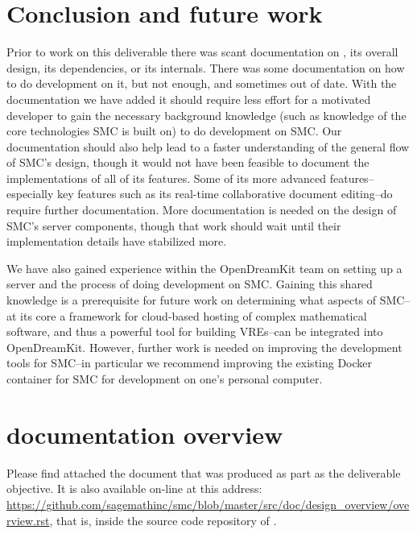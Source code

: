 \documentclass{deliverablereport}
\begin{document}
\section{Conclusion and future work}
Prior to work on this deliverable there was scant documentation on \SMC, its
overall design, its dependencies, or its internals.  There was some
documentation on how to do development on it, but not enough, and sometimes out
of date.  With the documentation we have added it should require less effort
for a motivated developer to gain the necessary background knowledge (such as
knowledge of the core technologies SMC is built on) to do development on SMC.
Our documentation should also help lead to a faster understanding of the
general flow of SMC's design, though it would not have been feasible to
document the implementations of all of its features.  Some of its more advanced
features--especially key features such as its real-time collaborative document
editing--do require further documentation.  More documentation is needed on the
design of SMC's server components, though that work should wait until their
implementation details have stabilized more.

We have also gained experience within the OpenDreamKit team on setting up a
\SMC server and the process of doing development on SMC.  Gaining this shared
knowledge is a prerequisite for future work on determining what aspects of
SMC--at its core a framework for cloud-based hosting of complex mathematical
software, and thus a powerful tool for building VREs--can be integrated into
OpenDreamKit.  However, further work is needed on improving the development
tools for SMC--in particular we recommend improving the existing Docker
container for SMC for development on one's personal computer.


\printbibliography

\appendix
\section{\SMC documentation overview}
\label{app:doc}

Please find attached the document that was produced as part as the deliverable
objective.  It is also available on-line at this address:
\url{https://github.com/sagemathinc/smc/blob/master/src/doc/design_overview/overview.rst},
that is, inside the source code repository of \SMC.


\end{document}

